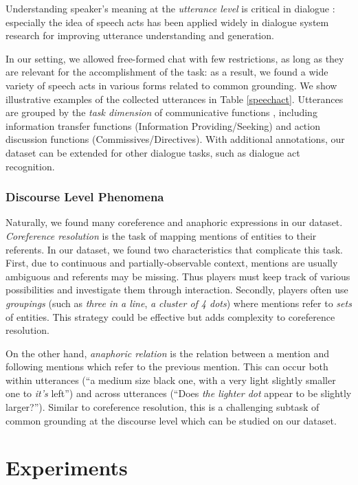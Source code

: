 \documentclass[letterpaper]{article} %
\newcommand{\utterance}[1]{``#1''}
\begin{document}
Understanding speaker's meaning at the \emph{utterance level} is critical in dialogue \cite{grice1957meaning}: especially the idea of speech acts \cite{austin1975things,searle1969speech} has been applied widely in dialogue system research for improving utterance understanding and generation.

In our setting, we allowed free-formed chat with few restrictions, as long as they are relevant for the accomplishment of the task: as a result, we found a wide variety of speech acts in various forms related to common grounding. We show illustrative examples of the collected utterances in Table \ref{speechact}. Utterances are grouped by the \emph{task dimension} of communicative functions \cite{bunt2017dialogue}, including information transfer functions (Information Providing/Seeking) and action discussion functions (Commissives/Directives). With additional annotations, our dataset can be extended for other dialogue tasks, such as dialogue act recognition.

\subsubsection{Discourse Level Phenomena}

Naturally, we found many coreference and anaphoric expressions in our dataset. \emph{Coreference resolution} is the task of mapping mentions of entities to their referents. In our dataset, we found two characteristics that complicate this task. First, due to continuous and partially-observable context, mentions are usually ambiguous and referents may be missing. Thus players must keep track of various possibilities and investigate them through interaction. Secondly, players often use \emph{groupings} (such as \textit{three in a line}, \textit{a cluster of 4 dots}) where mentions refer to \emph{sets} of entities. This strategy could be effective but adds complexity to coreference resolution.

On the other hand, \emph{anaphoric relation} is the relation between a mention and following mentions which refer to the previous mention. This can occur both within utterances (\utterance{a medium size black one, with a very light slightly smaller one to \textit{it's} left}) and across utterances (\utterance{Does \textit{the lighter dot} appear to be slightly larger?}). Similar to coreference resolution, this is a challenging subtask of common grounding at the discourse level which can be studied on our dataset.

\section{Experiments}
\label{section:experiments}
\end{document}
